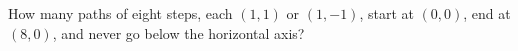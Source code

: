 How many paths of eight steps, each $(1,1)$ or $(1,-1)$, start at $(0,0)$, end at $(8,0)$, and never go below the horizontal axis?
